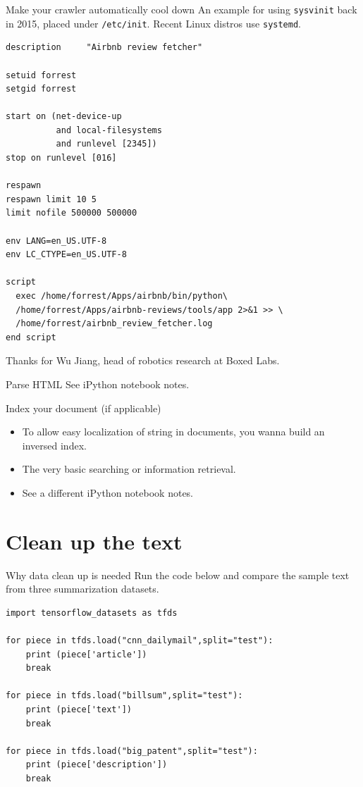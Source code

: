 \documentclass[11pt]{beamer}
\begin{document}
\begin{frame}[fragile]{Make your crawler automatically cool down}
An example for using \texttt{sysvinit} back in 2015, placed under \texttt{/etc/init}. Recent Linux distros use \texttt{systemd}. 
\begin{block}{}
{\tiny
\begin{verbatim}
description     "Airbnb review fetcher"

setuid forrest
setgid forrest

start on (net-device-up
          and local-filesystems
          and runlevel [2345])
stop on runlevel [016]

respawn
respawn limit 10 5
limit nofile 500000 500000

env LANG=en_US.UTF-8
env LC_CTYPE=en_US.UTF-8

script
  exec /home/forrest/Apps/airbnb/bin/python\ 
  /home/forrest/Apps/airbnb-reviews/tools/app 2>&1 >> \
  /home/forrest/airbnb_review_fetcher.log
end script
\end{verbatim}
}
\end{block}

Thanks for Wu Jiang, head of robotics research at Boxed Labs. 
\end{frame}


\begin{frame}{Parse HTML}
See iPython notebook notes. 
\end{frame}

\begin{frame}{Index your document (if applicable)}
 \begin{itemize}
  \item To allow easy localization of string in documents, you wanna build an inversed index. 
  \item The very basic searching or information retrieval. 
  \item See a different iPython notebook notes. 
 \end{itemize}
\end{frame}

\section{Clean up the text}

\begin{frame}[fragile]{Why data clean up is needed}
Run the code below and compare the sample text from three summarization datasets. 
\scriptsize 
\begin{verbatim}
import tensorflow_datasets as tfds 

for piece in tfds.load("cnn_dailymail",split="test"): 
    print (piece['article']) 
    break 

for piece in tfds.load("billsum",split="test"): 
    print (piece['text']) 
    break 

for piece in tfds.load("big_patent",split="test"): 
    print (piece['description']) 
    break
\end{verbatim}
\end{frame}
\end{document}
